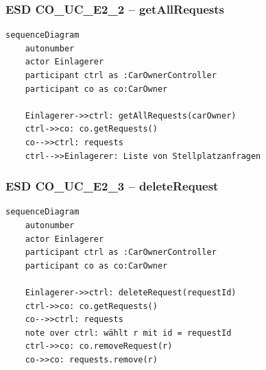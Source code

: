 \newpage

{}
\subsubsection*{ESD CO\_UC\_E2\_2 – getAllRequests}

\begin{lstlisting}[basicstyle=\ttfamily\small, breaklines=true]
sequenceDiagram
    autonumber
    actor Einlagerer
    participant ctrl as :CarOwnerController
    participant co as co:CarOwner

    Einlagerer->>ctrl: getAllRequests(carOwner)
    ctrl->>co: co.getRequests()
    co-->>ctrl: requests
    ctrl-->>Einlagerer: Liste von Stellplatzanfragen
\end{lstlisting}

\newpage

{}
\subsubsection*{ESD CO\_UC\_E2\_3 – deleteRequest}

\begin{lstlisting}[basicstyle=\ttfamily\small, breaklines=true]
sequenceDiagram
    autonumber
    actor Einlagerer
    participant ctrl as :CarOwnerController
    participant co as co:CarOwner

    Einlagerer->>ctrl: deleteRequest(requestId)
    ctrl->>co: co.getRequests()
    co-->>ctrl: requests
    note over ctrl: wählt r mit id = requestId
    ctrl->>co: co.removeRequest(r)
    co->>co: requests.remove(r)
\end{lstlisting}

\newpage

{}
